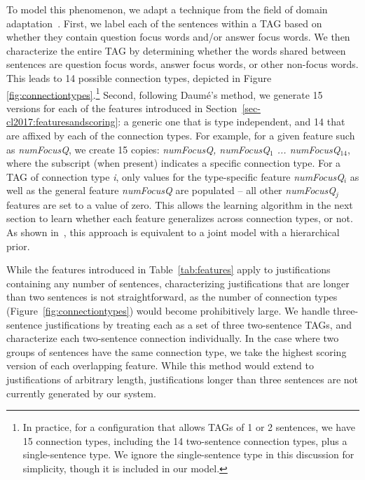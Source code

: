 To model this phenomenon, we adapt a technique from the field of domain adaptation~\citep{daume2007}.
First, we label each of the sentences within a TAG based on whether they contain question focus words and/or answer focus words.  We then characterize the entire TAG by determining whether the words shared between sentences are question focus words, answer focus words, or other non-focus words.  This leads to 14 possible connection types, depicted in Figure \ref{fig:connectiontypes}.\footnote{In practice, for a configuration that allows TAGs of 1 or 2 sentences, we have 15 connection types, including the 14 two-sentence connection types, plus a single-sentence type. We ignore the single-sentence type in this discussion for simplicity, though it is included in our model.}
Second, following Daum{\'e}'s method, we generate 15 versions for each of the features introduced in Section~\ref{sec-cl2017:featuresandscoring}: a generic one that is type independent, and 14 that are affixed by each of the connection types. For example, for a given feature such as \emph{numFocusQ}, we create 15 copies: \emph{numFocusQ, numFocusQ$_1$ ... numFocusQ$_{14}$}, where the subscript (when present) indicates a specific connection type. For a TAG of connection type \emph{i}, only values for the type-specific feature \emph{numFocusQ$_i$} as well as the general feature \emph{numFocusQ} are populated -- all other \emph{numFocusQ$_j$} features are set to a value of zero. This allows the learning algorithm in the next section to learn whether each feature generalizes across connection types, or not. As shown in~\citet{finkel2010hierarchical}, this approach is equivalent to a joint model with a hierarchical prior. 



While the features introduced in Table~\ref{tab:features} apply to justifications containing any number of sentences, characterizing justifications that are longer than two sentences is not straightforward, as the number of connection types (Figure~\ref{fig:connectiontypes}) would become prohibitively large.   We handle three-sentence justifications by treating each as a set of three two-sentence TAGs, and characterize each two-sentence connection individually.  In the case where two groups of sentences have the same connection type, we take the highest scoring version of each overlapping feature.  While this method would extend to justifications of arbitrary length,  justifications longer than three sentences are not currently generated by our system. 


